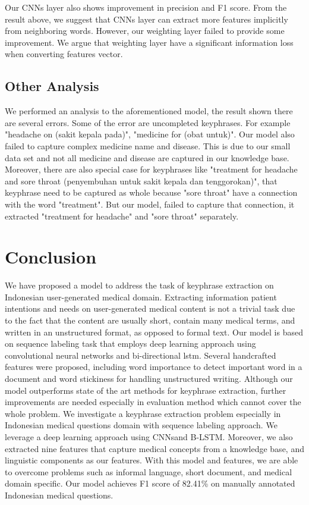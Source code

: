 Our CNNs layer also shows improvement in precision and F1 score. From the result above, we suggest that CNNs layer can extract more features implicitly from neighboring words. However, our weighting layer failed to provide some improvement. We argue that weighting layer have a significant information loss when converting features vector.

\subsection{Other Analysis}
We performed an analysis to the aforementioned model, the result shown there are several errors. Some of the error are uncompleted keyphrases. For example "headache on (sakit kepala pada)", "medicine for (obat untuk)". Our model also failed to capture complex medicine name and disease. This is due to our small data set and not all medicine and disease are captured in our knowledge base. Moreover, there are also special case for keyphrases like "treatment for headache and sore throat (penyembuhan untuk sakit kepala dan tenggorokan)", that keyphrase need to be captured as whole because "sore throat" have a connection with the word "treatment". But our model, failed to capture that connection, it extracted "treatment for headache" and "sore throat" separately.

\section{Conclusion}
We have proposed a model to address the task of keyphrase extraction on Indonesian user-generated medical domain. Extracting information patient intentions and needs on user-generated medical content is not a trivial task due to the fact that the content are usually short, contain many medical terms, and written in an unstructured format, as opposed to formal text. Our model is based on sequence labeling task that employs deep learning approach using convolutional neural networks and bi-directional lstm. Several handcrafted features were proposed, including word importance to detect important word in a document and word stickiness for handling unstructured writing. Although our model outperforms state of the art methods for keyphrase extraction, further improvements are needed especially in evaluation method which cannot cover the whole problem.
\iffalse
We investigate a keyphrase extraction problem especially in Indonesian medical questions domain with sequence labeling approach. We leverage a deep learning approach using CNNsand B-LSTM. Moreover, we also extracted nine features that capture medical concepts from a knowledge base, and linguistic components as our features. With this model and features, we are able to overcome problems such as informal language, short document, and medical domain specific. Our model achieves F1 score of 82.41\% on manually annotated Indonesian medical questions.

